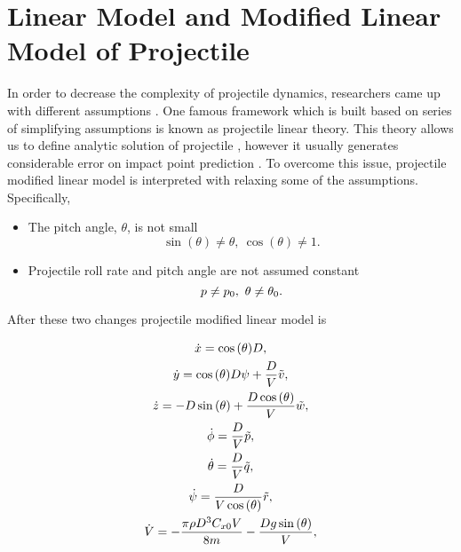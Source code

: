 \documentclass[letterpaper, 10 pt, conference]{ieeeconf}  %
\begin{document}
\section{Linear Model and Modified Linear Model of Projectile}
In order to decrease the complexity of projectile dynamics, researchers came up with different assumptions \cite{etkin2012dynamics, murphy1963free}. One famous framework which is built based on series of simplifying assumptions is known as projectile linear theory. This theory allows us to define analytic solution of projectile \cite{costello2004flight}, however it usually generates considerable error on impact point prediction \cite{hainz2005modified}. To overcome this issue, projectile modified linear model is interpreted with relaxing some of the assumptions. Specifically,
\begin{itemize}
\item The pitch angle, $ \theta $, is not small
\begin{equation}
\sin{(\theta)}\neq\theta, \ \cos{(\theta)}\neq 1.
\end{equation}
\item Projectile roll rate and pitch angle are not assumed constant
\begin{equation}
p\neq p_0, \\ \	 \theta\neq\theta_0.
\end{equation}
\end{itemize} 
After these two changes projectile modified linear model is
\begin{small}
\begin{gather}\small
\dot{x}=\cos{(\theta)} D, \\
\dot{y}=\cos{(\theta)} D \psi + \frac{D}{V} \tilde{v}, \\
\dot{z}=-D \sin{(\theta)} + \frac{D \cos{(\theta)}}{V} \tilde{w},
\\
\dot{\phi}=\frac{D}{V} \tilde{p},\\
\dot{\theta}=\frac{D}{V} \tilde{q}, \\
\dot{\psi}=\frac{D}{V \cos{(\theta)}} \tilde{r}, \\
\dot{V}=-\frac{\pi \rho D^3 C_{x0} V}{8 m} - \frac{D g \sin{(\theta)}}{V}, 
\end{gather} 
\end{small}
\end{document}
